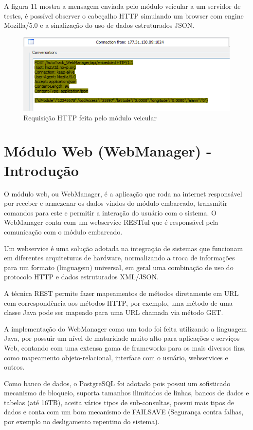 A figura 11 mostra a mensagem enviada pelo módulo veicular a um servidor de testes, é possível observer o cabeçalho HTTP simulando um browser com engine Mozilla/5.0 e a sinalização do uso de dados estruturados JSON.


\begin{figure}[!htb]
	\centering
	\includegraphics[width=7.00cm\textwidth]{figures/requisicao_post.png}
	\caption{Requisição HTTP feita pelo módulo veicular}
	\label{Figura 11}
\end{figure}

\section{Módulo Web (WebManager) - Introdução}

O módulo web, ou WebManager, é a aplicação que roda na internet responsável por receber e armezenar os dados vindos do módulo embarcado, transmitir comandos para este e permitir a interação do usuário com o sistema. O WebManager conta com um webservice RESTful que é responsável pela comunicação com o módulo embarcado.

Um webservice é uma solução adotada na integração de sistemas que funcionam em diferentes arquiteturas de hardware, normalizando a troca de informações para um formato (linguagem) universal, em geral uma combinação de uso do protocolo HTTP e dados estruturados XML/JSON. 

A técnica REST permite fazer mapeamentos de métodos diretamente em URL com correspondência aos métodos HTTP, por exemplo, uma método de uma classe Java pode ser mapeado para uma URL chamada via método GET.

A implementação do WebManager como um todo foi feita utilizando a linguagem Java, por possuir um nível de maturidade muito alto para aplicações e serviços Web, contando com uma extensa gama de frameworks para os mais diversos fins, como mapeamento objeto-relacional, interface com o usuário,  webservices e outros.

Como banco de dados, o PostgreSQL foi adotado  pois possui um sofisticado mecanismo de bloqueio, suporta tamanhos ilimitados de linhas, bancos de dados e tabelas (até 16TB), aceita vários tipos de sub-consultas, possui mais tipos de dados e conta com um bom mecanismo de FAILSAVE (Segurança contra falhas, por exemplo no desligamento repentino do sistema).

